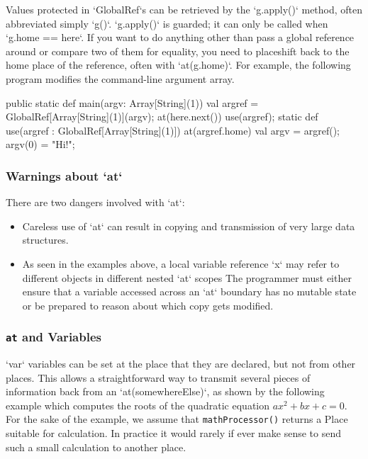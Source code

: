 Values protected in \xcd`GlobalRef`s can be retrieved by the \xcd`g.apply()`
method, often abbreviated simply \xcd`g()`.  \xcd`g.apply()` is guarded; it can
only be called when \xcd`g.home == here`.  If you  want to do anything other
than pass a global reference around or compare two of them for equality, you
need to placeshift back to the home place of the reference, often with
\xcd`at(g.home)`.   For example, the following  program modifies the
command-line argument array.

\begin{xten}
  public static def main(argv: Array[String](1)) {
    val argref = GlobalRef[Array[String](1)](argv);
    at(here.next()) use(argref);
  }
  static def use(argref : GlobalRef[Array[String](1)]) {
    at(argref.home) {
      val argv = argref();
      argv(0) = "Hi!";
    }
  }
\end{xten}





\subsubsection{Warnings about \xcd`at`}
There are two dangers involved with \xcd`at`: 
\begin{itemize}
\item Careless use of \xcd`at` can result in copying and transmission
of very large data structures.  
\item As seen in the examples above, a local variable reference
  \xcd`x` may refer to different objects in different nested \xcd`at`
  scopes The programmer must either ensure that a variable accessed
  across an \xcd`at` boundary has no mutable state or be prepared to
  reason about which copy gets modified. 
\end{itemize}

\subsubsection{{\tt at} and Variables}

\xcd`var` variables can be set at the place that they are declared, but not
from other places.  This allows a straightforward way to transmit several
pieces of information back from an \xcd`at(somewhereElse)`, as shown by the
following example which computes the roots of the quadratic equation 
{$ax^2 + bx + c = 0$}.  
For the sake of the example, we assume that 
{\tt mathProcessor()} returns a Place suitable for calculation.  In practice
it would rarely if ever make sense to send such a small calculation to another
place. 

